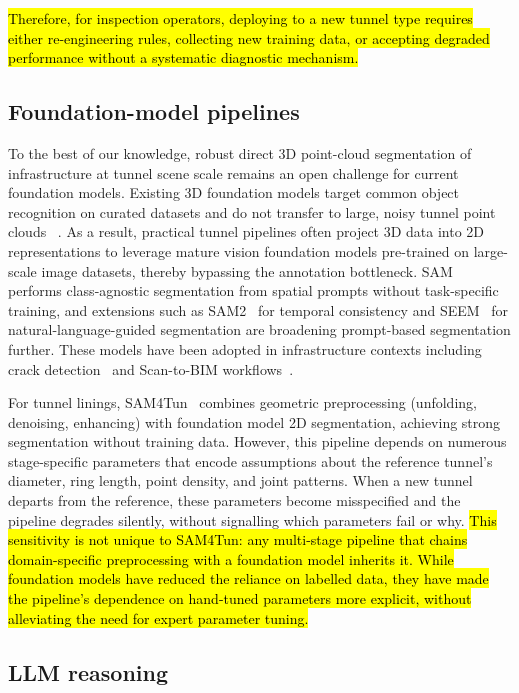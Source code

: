 \documentclass[a4paper,fleqn]{cas-dc}
\begin{document}
\hl{Therefore, for inspection operators, deploying to a new tunnel type requires either re-engineering rules, collecting new training data, or accepting degraded performance without a systematic diagnostic mechanism.}

\subsection{Foundation-model pipelines}

To the best of our knowledge, robust direct 3D point-cloud segmentation of infrastructure at tunnel scene scale remains an open challenge for current foundation models. Existing 3D foundation models target common object recognition on curated datasets and do not transfer to large, noisy tunnel point clouds ~\cite{liu2023openshape, guo2023pointbind, xu2024pointllm}. As a result, practical tunnel pipelines often project 3D data into 2D representations to leverage mature vision foundation models pre-trained on large-scale image datasets, thereby bypassing the annotation bottleneck. SAM~\cite{kirillov2023sam} performs class-agnostic segmentation from spatial prompts without task-specific training, and extensions such as SAM2~\cite{ravi2024sam2} for temporal consistency and SEEM~\cite{zou2023segment} for natural-language-guided segmentation are broadening prompt-based segmentation further. These models have been adopted in infrastructure contexts including crack detection~\cite{ravi2024cracksam} and Scan-to-BIM workflows~\cite{wang2024omni}.

For tunnel linings, SAM4Tun~\cite{ye2025sam4tun} combines geometric preprocessing (unfolding, denoising, enhancing) with foundation model 2D segmentation, achieving strong segmentation without training data. However, this pipeline depends on numerous stage-specific parameters that encode assumptions about the reference tunnel's diameter, ring length, point density, and joint patterns. When a new tunnel departs from the reference, these parameters become misspecified and the pipeline degrades silently, without signalling which parameters fail or why. \hl{This sensitivity is not unique to SAM4Tun: any multi-stage pipeline that chains domain-specific preprocessing with a foundation model inherits it. While foundation models have reduced the reliance on labelled data, they have made the pipeline's dependence on hand-tuned parameters more explicit, without alleviating the need for expert parameter tuning.}

\subsection{LLM reasoning}
\end{document}
